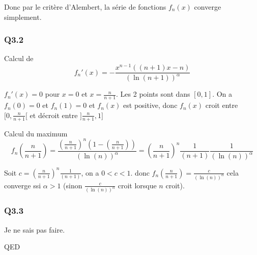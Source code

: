\documentclass[]{book}
\theoremstyle{definition}
\begin{document}
Donc par le crit\`ere d'Alembert, la s\'erie de fonctions $f_n(x)$ converge simplement.


\subsubsection*{Q3.2}
Calcul de 
$$f_n'(x) = -\frac{x^{n-1}((n+1)x -n)}{(\ln(n+1))^{\alpha}}$$

$f_n'(x) = 0$ pour $x=0$ et $x = \frac{n}{n+1}$. Les 2 points sont dans $[0,1]$.
On a $f_n(0) = 0$ et $f_n(1) = 0$ et $f_n(x)$ est positive, donc $f_n(x)$ croit entre $[0,\frac{n}{n+1}[$ et d\'ecroit entre $]\frac{n}{n+1},1]$

Calcul du maximum
$$f_n\left(\frac{n}{n+1}\right) =  \frac{\left(\frac{n}{n+1}\right)^n\left(1-\left(\frac{n}{n+1}\right)\right)}{(\ln(n))^{\alpha}} = \left(\frac{n}{n+1}\right)^n\frac{1}{(n+1)}\frac{1}{(\ln(n))^{\alpha}}$$

Soit $c = \left(\frac{n}{n+1}\right)^n\frac{1}{(n+1)} $, on a $0 < c < 1$. 
donc $f_n\left(\frac{n}{n+1}\right) = \frac{c}{(\ln(n))^{\alpha}}$ cela converge ssi $\alpha > 1$ (sinon $\frac{c}{(\ln(n))^{\alpha}}$ croit lorsque $n$ croit). 

\subsubsection*{Q3.3}
Je ne sais pas faire.

QED
\end{document}
